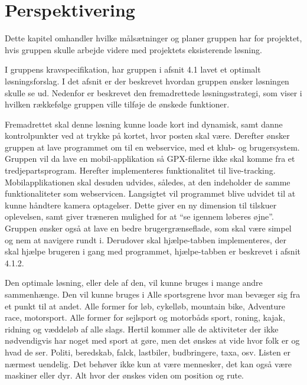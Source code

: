 \chapter{Perspektivering}
Dette kapitel omhandler hvilke målsætninger og planer gruppen har for projektet, hvis gruppen skulle arbejde videre med projektets eksisterende løsning.

I gruppens kravspecifikation, har gruppen i afsnit 4.1 lavet et optimalt løsningsforslag. I det afsnit er der beskrevet hvordan gruppen ønsker løsningen skulle se ud. Nedenfor er beskrevet den fremadrettede løsningsstrategi, som viser i hvilken rækkefølge gruppen ville tilføje de ønskede funktioner.

Fremadrettet skal denne løsning kunne loade kort ind dynamisk, samt danne kontrolpunkter ved at trykke på kortet, hvor posten skal være. Derefter ønsker gruppen at lave programmet om til en webservice, med et klub- og brugersystem. \newline
Gruppen vil da lave en mobil-applikation så GPX-filerne ikke skal komme fra et tredjepartsprogram. Herefter implementeres funktionalitet til live-tracking.  Mobilapplikationen skal desuden udvides, således, at den indeholder de samme funktionaliteter som webservicen. Langsigtet vil programmet blive udvidet til at kunne håndtere kamera optagelser. Dette giver en ny dimension til tilskuer oplevelsen, samt giver træneren mulighed for at “se igennem løberes øjne”. \newline
Gruppen ønsker også at lave en bedre brugergrænseflade, som skal være simpel og nem at navigere rundt i. Derudover skal hjælpe-tabben implementeres, der skal hjælpe brugeren i gang med programmet, hjælpe-tabben er beskrevet i afsnit 4.1.2. 

Den optimale løsning, eller dele af den, vil kunne bruges i mange andre sammenhænge. Den vil kunne bruges i Alle sportsgrene hvor man bevæger sig fra et punkt til at andet. Alle former for løb, cykelløb, mountain bike, Adventure race, motorsport. Alle former for sejlsport og motorbåds sport, roning, kajak, ridning og væddeløb af alle slags. Hertil kommer alle de aktiviteter der ikke nødvendigvis har noget med sport at gøre, men det ønskes at vide hvor folk er og hvad de ser. Politi, beredskab, falck, lastbiler, budbringere, taxa, osv. Listen er nærmest uendelig. Det behøver ikke kun at være mennesker, det kan også være maskiner eller dyr. Alt hvor der ønskes viden om position og rute.
